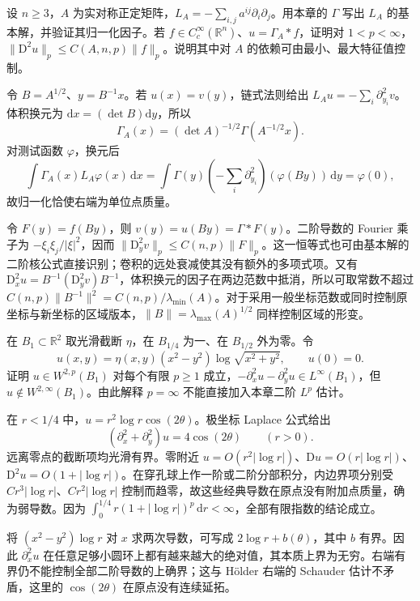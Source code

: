 \begin{exercise}\label{g3:ex:anisotropic-fundamental-solution}
	设 \(n\ge3\)，\(A\) 为实对称正定矩阵，\(L_A=-\sum_{i,j}a^{ij}\partial_i\partial_j\)。用本章的 \(\Gamma\) 写出 \(L_A\) 的基本解，并验证其归一化因子。若 \(f\in C_c^\infty(\mathbb R^n)\)、\(u=\Gamma_A*f\)，证明对 \(1<p<\infty\)，\(\|\mathrm D^2u\|_p\le C(A,n,p)\|f\|_p\)。说明其中对 \(A\) 的依赖可由最小、最大特征值控制。
\end{exercise}
\begin{solution}
	令 \(B=A^{1/2}\)、\(y=B^{-1}x\)。若 \(u(x)=v(y)\)，链式法则给出 \(L_Au=-\sum_i\partial_{y_i}^2v\)。体积换元为 \(\mathrm dx=(\det B)\mathrm dy\)，所以
	\[
		\Gamma_A(x)=(\det A)^{-1/2}\Gamma(A^{-1/2}x).
	\]
	对测试函数 \(\varphi\)，换元后
	\[
		\int\Gamma_A(x)L_A\varphi(x)\,\mathrm dx
		=\int\Gamma(y)\left(-\sum_i\partial_{y_i}^2\right)(\varphi(By))\,\mathrm dy
		=\varphi(0),
	\]
	故归一化恰使右端为单位点质量。

	令 \(F(y)=f(By)\)，则 \(v(y)=u(By)=\Gamma*F(y)\)。二阶导数的 Fourier 乘子为 \(-\xi_i\xi_j/|\xi|^2\)，因而 \(\|\mathrm D_y^2v\|_p\le C(n,p)\|F\|_p\)。这一恒等式也可由基本解的二阶核公式直接识别；卷积的远处衰减使其没有额外的多项式项。又有
	\(\mathrm D_x^2u=B^{-1}(\mathrm D_y^2v)B^{-1}\)，体积换元的因子在两边范数中抵消，所以可取常数不超过 \(C(n,p)\|B^{-1}\|^2=C(n,p)/\lambda_{\min}(A)\)。对于采用一般坐标范数或同时控制原坐标与新坐标的区域版本，\(\|B\|=\lambda_{\max}(A)^{1/2}\) 同样控制区域的形变。
\end{solution}

\begin{exercise}\label{g3:ex:lp-endpoint-poisson}
	在 \(B_1\subset\mathbb R^2\) 取光滑截断 \(\eta\)，在 \(B_{1/4}\) 为一、在 \(B_{1/2}\) 外为零。令
	\[
		u(x,y)=\eta(x,y)(x^2-y^2)\log\sqrt{x^2+y^2},\qquad u(0)=0.
	\]
	证明 \(u\in W^{2,p}(B_1)\) 对每个有限 \(p\ge1\) 成立，\(-\partial_x^2u-\partial_y^2u\in L^\infty(B_1)\)，但 \(u\notin W^{2,\infty}(B_1)\)。由此解释 \(p=\infty\) 不能直接加入本章二阶 \(L^p\) 估计。
\end{exercise}
\begin{solution}
	在 \(r<1/4\) 中，\(u=r^2\log r\cos(2\theta)\)。极坐标 Laplace 公式给出
	\[
		(\partial_x^2+\partial_y^2)u=4\cos(2\theta)\qquad(r>0).
	\]
	远离零点的截断项均光滑有界。零附近 \(u=O(r^2|\log r|)\)、\(\mathrm Du=O(r|\log r|)\)、\(\mathrm D^2u=O(1+|\log r|)\)。在穿孔球上作一阶或二阶分部积分，内边界项分别受 \(Cr^3|\log r|\)、\(Cr^2|\log r|\) 控制而趋零，故这些经典导数在原点没有附加点质量，确为弱导数。因为 \(\int_0^{1/4}r(1+|\log r|)^p\,\mathrm dr<\infty\)，全部有限指数的结论成立。

	将 \((x^2-y^2)\log r\) 对 \(x\) 求两次导数，可写成 \(2\log r+b(\theta)\)，其中 \(b\) 有界。因此 \(\partial_x^2u\) 在任意足够小圆环上都有越来越大的绝对值，其本质上界为无穷。右端有界仍不能控制全部二阶导数的上确界；这与 Hölder 右端的 Schauder 估计不矛盾，这里的 \(\cos(2\theta)\) 在原点没有连续延拓。
\end{solution}

